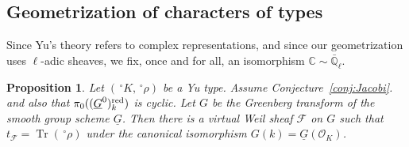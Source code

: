 \documentclass[10pt]{amsart}
\theoremstyle{plain}
\newtheorem{proposition}[theorem]{Proposition}
\theoremstyle{definition}
\newcommand{\CC}{{\mathbb{C}}}
\newcommand{\EE}{\mathbb{\bar Q}_\ell}
\newcommand{\OK}{\mathcal{O}_K}
\newcommand{\Fq}{k}
\DeclareMathOperator{\trace}{Tr}
\newcommand{\trFrob}[1]{t_{#1}}
\begin{document}
\subsection{Geometrization of characters of types}\label{ssec:geotypes}

Since Yu's theory refers to complex representations, and since our geometrization uses $\ell$-adic sheaves, we fix, once and for all, an isomorphism $\CC \sim \EE$.

\begin{proposition}\label{prop:geotypes}
Let $(\,^\circ K,\,^\circ \rho)$ be a Yu type.
Assume Conjecture~\ref{conj:Jacobi}.
and also that $\pi_0((\underline{G}^0)_\Fq^\reductive)$ is cyclic.
Let $G$ be the Greenberg transform of the smooth group scheme $\underline{G}$.
Then there is a virtual Weil sheaf $\mathcal{F}$ on $G$ such that $\trFrob{\mathcal{F}} = \trace(\,^\circ \rho)$ under the canonical isomorphism $G(\Fq) = \underline{G}(\OK)$.
\end{proposition}
\end{document}
